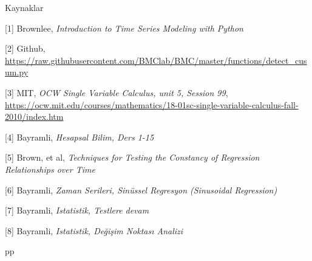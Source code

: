\documentclass[12pt,fleqn]{article}\usepackage{../../common}
\begin{document}
Kaynaklar

[1] Brownlee, {\em Introduction to Time Series Modeling with Python}

[2] Github, \url{https://raw.githubusercontent.com/BMClab/BMC/master/functions/detect_cusum.py}

[3] MIT, {\em OCW Single Variable Calculus, unit 5, Session 99},
         \url{https://ocw.mit.edu/courses/mathematics/18-01sc-single-variable-calculus-fall-2010/index.htm}

[4] Bayramli, {\em Hesapsal Bilim, Ders 1-15}
         
[5] Brown, et al, {\em Techniques for Testing the Constancy of Regression Relationships over Time}

[6] Bayramli, {\em Zaman Serileri, Sinüssel Regresyon (Sinusoidal Regression)}

[7] Bayramli, {\em Istatistik, Testlere devam}

[8] Bayramli, {\em Istatistik, Değişim Noktası Analizi}

pp
\end{document}
